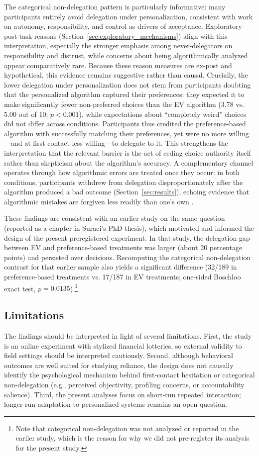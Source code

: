 \documentclass[a4paper, 12pt, fleqn]{article}
\theoremstyle{definition}
\begin{document}
The categorical non-delegation pattern is particularly informative: many participants entirely avoid delegation under personalization, consistent with work on autonomy, responsibility, and control as drivers of acceptance. Exploratory post-task reasons (Section~\ref{sec:exploratory_mechanisms}) align with this interpretation, especially the stronger emphasis among never-delegators on responsibility and distrust, while concerns about being algorithmically analyzed appear comparatively rare. Because these reason measures are ex-post and hypothetical, this evidence remains suggestive rather than causal. Crucially, the lower delegation under personalization does not stem from participants doubting that the personalized algorithm captured their preferences: they expected it to make significantly fewer non-preferred choices than the EV algorithm (3.78 vs. 5.00 out of 10; $p < 0.001$), while expectations about ``completely weird'' choices did not differ across conditions. Participants thus credited the preference-based algorithm with successfully matching their preferences, yet were no more willing---and at first contact less willing---to delegate to it. This strengthens the interpretation that the relevant barrier is the act of ceding choice authority itself rather than skepticism about the algorithm's accuracy. A complementary channel operates through how algorithmic errors are treated once they occur: in both conditions, participants withdrew from delegation disproportionately after the algorithm produced a bad outcome (Section~\ref{sec:results}), echoing evidence that algorithmic mistakes are forgiven less readily than one's own \citep{Dietvorst2018,Renier2021}.

These findings are consistent with an earlier study on the same question (reported as a chapter in Suraci's PhD thesis), which motivated and informed the design of the present preregistered experiment. In that study, the delegation gap between EV and preference-based treatments was larger (about 20 percentage points) and persisted over decisions. Recomputing the categorical non-delegation contrast for that earlier sample also yields a significant difference (32/189 in preference-based treatments vs. 17/187 in EV treatments; one-sided Boschloo exact test, $p = 0.0135$).\footnote{Note that categorical non-delegation was not analyzed or reported in the earlier study, which is the reason for why we did not pre-register its analysis for the present study.}

\subsection{Limitations}
The findings should be interpreted in light of several limitations. First, the study is an online experiment with stylized financial lotteries, so external validity to field settings should be interpreted cautiously. Second, although behavioral outcomes are well suited for studying reliance, the design does not causally identify the psychological mechanism behind first-contact hesitation or categorical non-delegation (e.g., perceived objectivity, profiling concerns, or accountability salience). Third, the present analyses focus on short-run repeated interaction; longer-run adaptation to personalized systems remains an open question.
\end{document}
